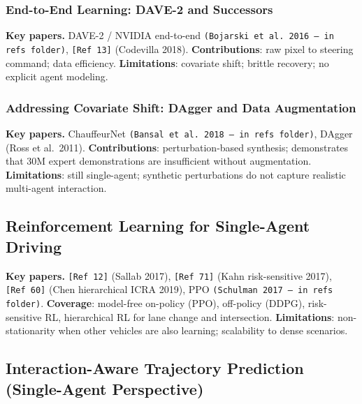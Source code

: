 \documentclass[12pt, a4paper]{article}
\begin{document}
\subsubsection{End-to-End Learning: DAVE-2 and Successors}

\begin{outline_note}
\textbf{Key papers.}
DAVE-2 / NVIDIA end-to-end \texttt{(Bojarski et al.\ 2016 -- in refs folder)},
\texttt{[Ref\,13]} (Codevilla 2018).
\textbf{Contributions}: raw pixel to steering command; data efficiency.
\textbf{Limitations}: covariate shift; brittle recovery; no explicit
agent modeling.
\end{outline_note}

\subsubsection{Addressing Covariate Shift: DAgger and Data Augmentation}

\begin{outline_note}
\textbf{Key papers.}
ChauffeurNet \texttt{(Bansal et al.\ 2018 -- in refs folder)},
DAgger (Ross et al.\ 2011).
\textbf{Contributions}: perturbation-based synthesis; demonstrates that
30M expert demonstrations are insufficient without augmentation.
\textbf{Limitations}: still single-agent; synthetic perturbations
do not capture realistic multi-agent interaction.
\end{outline_note}

\subsection{Reinforcement Learning for Single-Agent Driving}

\begin{outline_note}
\textbf{Key papers.}
\texttt{[Ref\,12]} (Sallab 2017), \texttt{[Ref\,71]} (Kahn risk-sensitive 2017),
\texttt{[Ref\,60]} (Chen hierarchical ICRA 2019),
PPO \texttt{(Schulman 2017 -- in refs folder)}.
\textbf{Coverage}: model-free on-policy (PPO), off-policy (DDPG),
risk-sensitive RL, hierarchical RL for lane change and intersection.
\textbf{Limitations}: non-stationarity when other vehicles are also
learning; scalability to dense scenarios.
\end{outline_note}

\subsection{Interaction-Aware Trajectory Prediction (Single-Agent Perspective)}
\end{document}
